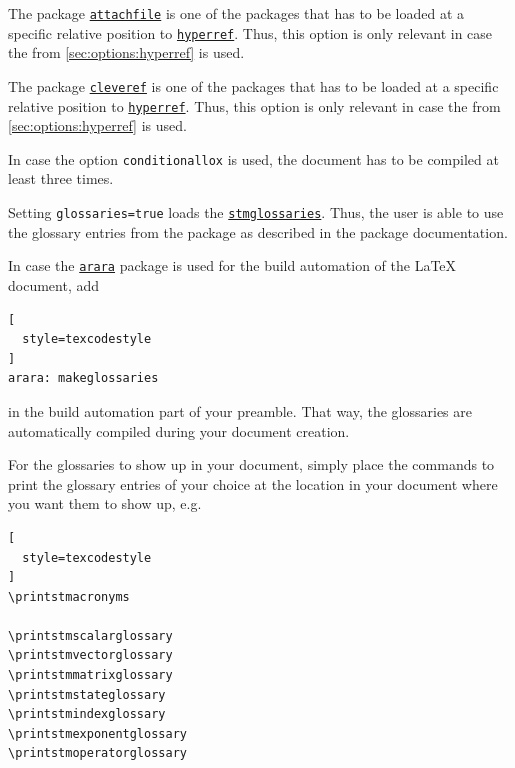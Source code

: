 \documentclass[%
  type=article,%
  layout=koma,%
  fleqn,%
  page=false,%
  cleveref=true,%
  conditionallox=true,%
  conditionalloxnewpage=true,%
  date=true,%
  glossaries=true,%
  hyperref=true,%
  index=true,%
  listings=true%
]{stmtext}
\newcommand{\stmlatexpackagelink}[1]{\href{https://github.com/raedma/stmlatex/blob/master/doc/#1/#1.pdf}{\texttt{#1}}}
\newcommand{\ctanpackagelink}[1]{\href{https://ctan.org/pkg/#1}{\texttt{#1}}}
\begin{document}
The package \ctanpackagelink{attachfile} is one of the packages that has to be loaded at a specific relative position to \ctanpackagelink{hyperref}. Thus, this option is only relevant in case the  from \cref{sec:options:hyperref} is used.

\label{sec:options:cleveref}

The package \ctanpackagelink{cleveref} is one of the packages that has to be loaded at a specific relative position to \ctanpackagelink{hyperref}. Thus, this option is only relevant in case the  from \cref{sec:options:hyperref} is used.



In case the option \texttt{conditionallox} is used, the document has to be compiled at least three times.




Setting \texttt{glossaries=true} loads the \stmlatexpackagelink{stmglossaries}. Thus, the user is able to use the glossary entries from the package as described in the package documentation.

In case the \ctanpackagelink{arara} package is used for the build automation of the \LaTeX{} document, add
\begin{lstlisting}[
  style=texcodestyle
]
arara: makeglossaries
\end{lstlisting}

in the build automation part of your preamble. That way, the glossaries are automatically compiled during your document creation.

For the glossaries to show up in your document, simply place the commands to print the glossary entries of your choice at the location in your document where you want them to show up, e.g.

\begin{lstlisting}[
  style=texcodestyle
]
\printstmacronyms

\printstmscalarglossary
\printstmvectorglossary
\printstmmatrixglossary
\printstmstateglossary
\printstmindexglossary
\printstmexponentglossary
\printstmoperatorglossary
\end{lstlisting}
\end{document}
